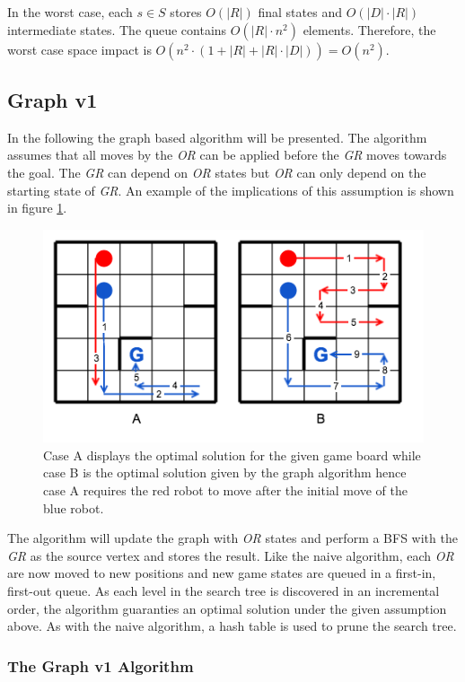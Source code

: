 \documentclass[]{article}
\begin{document}
In the worst case, each \(s \in S\) stores \(O(|R|)\) final states and
\(O(|D| \cdot |R|)\) intermediate states. The queue contains
\(O(|R| \cdot n^2)\) elements. Therefore, the worst case space impact is
\(O(n^2 \cdot(1 + |R| + |R| \cdot |D|)) = O(n^2)\).

\subsection{Graph v1}\label{graph-v1}

In the following the graph based algorithm will be presented. The
algorithm assumes that all moves by the \emph{OR} can be applied before
the \emph{GR} moves towards the goal. The \emph{GR} can depend on
\emph{OR} states but \emph{OR} can only depend on the starting state of
\emph{GR}. An example of the implications of this assumption is shown in
figure \ref{fig:graph_cases}.

\begin{figure}[htb]
\centering
\includegraphics[width=0.6\linewidth]{img/graph_cases.png}
\caption{Case A displays the optimal solution for the given game board while case B is the optimal solution given by the graph algorithm hence case A requires the red robot to move after the initial move of the blue robot.}
\label{fig:graph_cases}
\end{figure}

The algorithm will update the graph with \emph{OR} states and perform a
BFS with the \emph{GR} as the source vertex and stores the result. Like
the naive algorithm, each \emph{OR} are now moved to new positions and
new game states are queued in a first-in, first-out queue. As each level
in the search tree is discovered in an incremental order, the algorithm
guaranties an optimal solution under the given assumption above. As with
the naive algorithm, a hash table is used to prune the search tree.

\subsubsection{The Graph v1 Algorithm}\label{the-graph-v1-algorithm}
\end{document}
